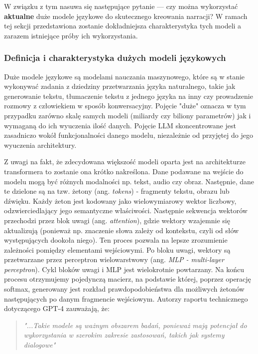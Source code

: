 W związku z tym nasuwa się następujące pytanie --- czy można wykorzystać \textbf{aktualne} duże modele
językowe do skutecznego kreowania narracji? W ramach tej sekcji przedstawiona zostanie dokładniejsza
charakterystyka tych modeli a zarazem istniejące próby ich wykorzystania.

\subsubsection*{Definicja i charakterystyka dużych modeli językowych}

Duże modele językowe są modelami nauczania maszynowego, które są w stanie wykonywać zadania z dziedziny
przetwarzania języka naturalnego, takie jak generowanie tekstu, tłumaczenie tekstu z jednego języka
na inny czy prowadzenie rozmowy z człowiekiem w sposób konwersacyjny\cite{larp_language}. Pojęcie
"duże" oznacza w tym przypadku zarówno skalę samych modeli (miliardy czy biliony parametrów) jak i
wymaganą do ich wyuczenia ilość danych. Pojęcie LLM skoncentrowane jest zasadniczo wokół funkcjonalności
danego modelu, niezależnie od przyjętej do jego wyuczenia architektury.

Z uwagi na fakt, że zdecydowana większość modeli oparta jest na architekturze transformera to zostanie
ona krótko nakreślona. Dane podawane na wejście do modelu mogą być różnych modalności np. tekst,
audio czy obraz. Następnie, dane te dzielone są na tzw. żetony (ang. \textit{tokens}) - fragmenty tekstu,
obrazu lub dźwięku. Każdy żeton jest kodowany jako wielowymiarowy wektor liczbowy, odzwierciedlający
jego semantyczne właściwości. Następnie sekwencja wektorów przechodzi przez blok uwagi (ang.
\textit{attention}), gdzie wektory wzajemnie się aktualizują (ponieważ np. znaczenie słowa zależy od
kontekstu, czyli od słów występujących dookoła niego). Ten proces pozwala na lepsze zrozumienie
zależności pomiędzy elementami wejściowymi. Po bloku uwagi, wektory są przetwarzane przez
perceptron wielowarstwowy (ang. \textit{MLP - multi-layer perceptron}). Cykl bloków uwagi i MLP jest
wielokrotnie powtarzany. Na końcu procesu otrzymujemy pojedynczą macierz, na podstawie której, poprzez
operację softmax, generowany jest rozkład prawdopodobieństwa dla możliwych żetonów następujących po
danym fragmencie wejściowym. Autorzy raportu technicznego dotyczącego GPT-4 zauważają, że:

\begin{quote}
    \textit{"...Takie modele są ważnym obszarem badań, ponieważ mają potencjał do wykorzystania w szerokim
        zakresie zastosowań, takich jak systemy dialogowe"}\cite{openai2024gpt4}
\end{quote}

